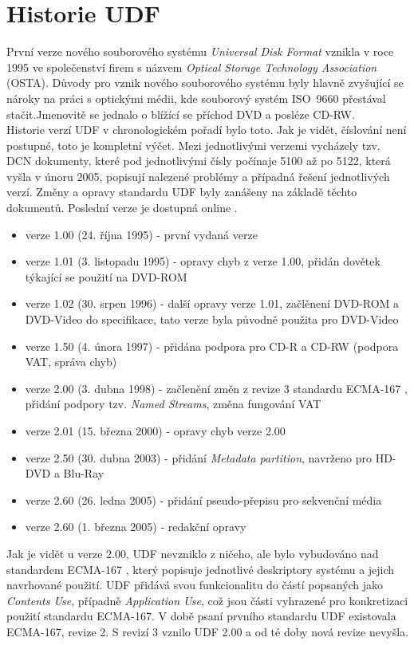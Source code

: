 \section{Historie UDF}
\label{sec:historie-udf}
První verze nového souborového systému \textit{Universal Disk Format} vznikla v roce 1995 ve společenství firem s názvem \textit{Optical Storage Technology Association} (OSTA). Důvody pro vznik nového souborového systému byly hlavně zvyšující se nároky na práci s optickými médii, kde souborový systém ISO~9660 přestával stačit.Jmenovitě se jednalo o blížící se příchod DVD a posléze CD-RW.\\
Historie verzí UDF v chronologickém pořadí bylo toto. Jak je vidět, číslování není postupné, toto je kompletní výčet. Mezi jednotlivými verzemi vycházely tzv. DCN dokumenty, které pod jednotlivými čísly počínaje 5100 až po 5122, která vyšla v únoru 2005, popisují nalezené problémy a případná řešení jednotlivých verzí. Změny a opravy standardu UDF byly zanášeny na základě těchto dokumentů. Poslední verze je dostupná online \cite{dcn}.
\begin{itemize}
    \item verze 1.00 (24. října 1995) - první vydaná verze
    \item verze 1.01 (3. listopadu 1995) - opravy chyb z verze 1.00, přidán dovětek týkající se použití na DVD-ROM
    \item verze 1.02 (30. srpen 1996) - další opravy verze 1.01, začlěnení DVD-ROM a DVD-Video do specifikace, tato verze byla původně použita pro DVD-Video
    \item verze 1.50 (4. února 1997) - přidána podpora pro CD-R a CD-RW (podpora VAT, správa chyb)
    \item verze 2.00 (3. dubna 1998) - začlenění změn z revize 3 standardu ECMA-167 \cite{ecma-167}, přidání podpory tzv. \textit{Named Streams}, změna fungování VAT
    \item verze 2.01 (15. března 2000) - opravy chyb verze 2.00
    \item verze 2.50 (30. dubna 2003) - přidání \textit{Metadata partition}, navrženo pro HD-DVD a Blu-Ray
    \item verze 2.60 (26. ledna 2005) - přidání pseudo-přepisu pro sekvenční média
    \item verze 2.60 (1. března 2005) - redakční opravy
\end{itemize}
Jak je vidět u verze 2.00, UDF nevzniklo z ničeho, ale bylo vybudováno nad standardem ECMA-167 \cite{ecma-167}, který popisuje jednotlivé deskriptory systému a jejich navrhované použití. UDF přidává svou funkcionalitu do částí popsaných jako \textit{Contents Use}, případně \textit{Application Use}, což jsou části vyhrazené pro konkretizaci použití standardu ECMA-167. V době psaní prvního standardu UDF existovala ECMA-167, revize 2. S revizí 3 vznilo UDF 2.00 a od té doby nová revize nevyšla. 

